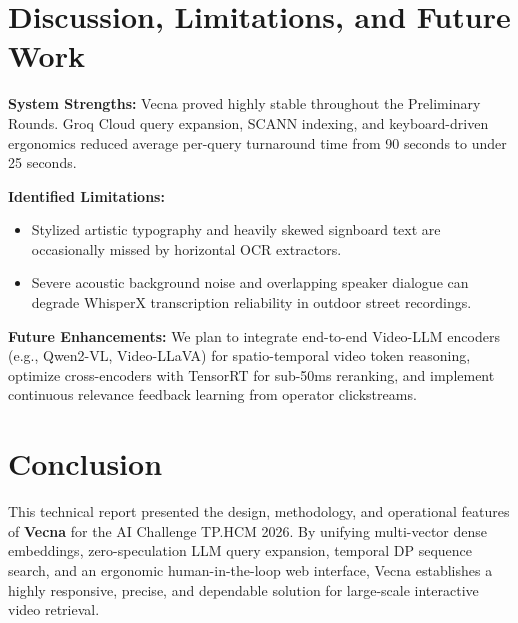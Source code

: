 \documentclass[10pt,a4paper,twocolumn]{article}
\begin{document}
\section{Discussion, Limitations, and Future Work}
\textbf{System Strengths:} Vecna proved highly stable throughout the Preliminary Rounds. Groq Cloud query expansion, SCANN indexing, and keyboard-driven ergonomics reduced average per-query turnaround time from 90 seconds to under 25 seconds.

\textbf{Identified Limitations:}
\begin{itemize}
    \item Stylized artistic typography and heavily skewed signboard text are occasionally missed by horizontal OCR extractors.
    \item Severe acoustic background noise and overlapping speaker dialogue can degrade WhisperX transcription reliability in outdoor street recordings.
\end{itemize}

\textbf{Future Enhancements:} We plan to integrate end-to-end Video-LLM encoders (e.g., Qwen2-VL, Video-LLaVA) for spatio-temporal video token reasoning, optimize cross-encoders with TensorRT for sub-50ms reranking, and implement continuous relevance feedback learning from operator clickstreams.

\section{Conclusion}
This technical report presented the design, methodology, and operational features of \textbf{Vecna} for the AI Challenge TP.HCM 2026. By unifying multi-vector dense embeddings, zero-speculation LLM query expansion, temporal DP sequence search, and an ergonomic human-in-the-loop web interface, Vecna establishes a highly responsive, precise, and dependable solution for large-scale interactive video retrieval.
\end{document}
